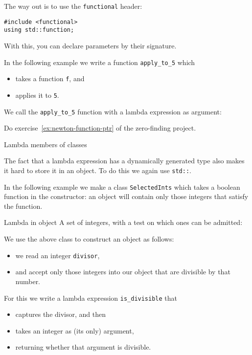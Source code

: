 The way out is to use the \lstinline{functional} header:
\begin{lstlisting}
#include <functional>
using std::function;
\end{lstlisting}
With this, you can declare parameters by their signature.

In the following example we write a function \lstinline{apply_to_5}
which 
\begin{itemize}
\item takes a function \lstinline{f}, and
\item applies it to \lstinline{5}.
\end{itemize}
We call the \lstinline{apply_to_5} function
with a lambda expression as argument:


\begin{exercise}
  Do exercise~\ref{ex:newton-function-ptr} of the zero-finding project.
\end{exercise}

 {Lambda members of classes}

The fact that a lambda expression has a dynamically generated type
also makes it hard to store it in an object.
To do this we again use \lstinline{std::}.

In the following example we make a class \lstinline{SelectedInts}
which takes a boolean function in the constructor:
an object will contain only those integers that satisfy the function.

\begin{block}{Lambda in object}
  \label{sl:lambda-class}
  A set of integers, with a test on which ones can be admitted:
  \begin{multicols}{2}
  \end{multicols}
\end{block}

We use the above class to construct an object as follows:
\begin{itemize}
\item we read an integer \lstinline{divisor},
\item and accept only those integers into our object
  that are divisible by that number.
\end{itemize}
For this we write a lambda expression \lstinline{is_divisible} that 
\begin{itemize}
\item captures the divisor, and then
\item takes an integer as (its only) argument,
\item returning whether that argument is divisible.
\end{itemize}

